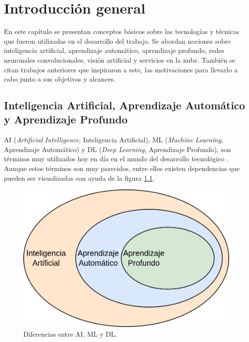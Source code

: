 
\chapter{Introducción general} %
\label{Chapter1} %
\label{IntroGeneral}


\newcommand{\keyword}[1]{\textbf{#1}}
\newcommand{\tabhead}[1]{\textbf{#1}}
\newcommand{\code}[1]{\texttt{#1}}
\newcommand{\file}[1]{\texttt{\bfseries#1}}
\newcommand{\option}[1]{\texttt{\itshape#1}}
\newcommand{\grados}{$^{\circ}$}

En este capítulo se presentan conceptos básicos sobre las tecnologías y técnicas que fueron utilizadas en el desarrollo del trabajo. Se abordan nociones sobre inteligencia artificial, aprendizaje automático, aprendizaje profundo, redes neuronales convolucionales, visión artificial y servicios en la nube. También se citan trabajos anteriores que inspiraron a este, las motivaciones para llevarlo a cabo junto a sus objetivos y alcances.

\section{Inteligencia Artificial, Aprendizaje Automático y Aprendizaje Profundo}

AI (\textit{Artificial Intelligence}, Inteligencia Artificial), ML (\textit{Machine Learning}, Aprendizaje Automático) y DL (\textit{Deep Learning}, Aprendizaje Profundo), son términos muy utilizados hoy en día en el mundo del desarrollo tecnológico \cite{ai_ml_dl}. Aunque estos términos son muy parecidos, entre ellos existen dependencias que pueden ser visualizadas con ayuda de la figura \ref{fig:ai_ml_dl}.

\begin{figure}[h]
	\centering
	\includegraphics[scale=0.25]{./Figures/ai_ml_dl.png}
	\caption{Diferencias entre AI, ML y DL.}
	\label{fig:ai_ml_dl}
\end{figure}

